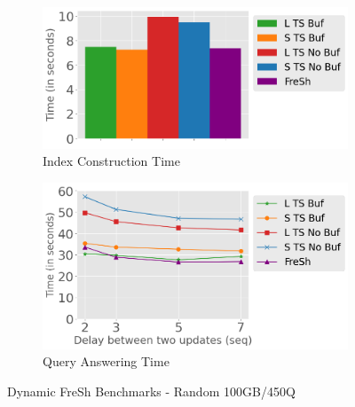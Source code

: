 
\begin{figure}
	\centering
	\begin{subfigure}[c]{0.48\textwidth}
		\includegraphics[width=1\textwidth]   {figures/Experiments/Dynamic/Delays/index_construction_all.png}
		\caption{Index Construction Time}
		\label{fig:actual-index-Construction-time}
	\end{subfigure}
	\begin{subfigure}[c]{0.48\textwidth}
		\includegraphics[width=1\textwidth]   {figures/Experiments/Dynamic/Delays/qa_delay_x_axis.png}
		\caption{Query Answering Time}
		\label{fig:actual-query-answering-time}
	\end{subfigure}
	\caption{Dynamic FreSh Benchmarks - Random 100GB/450Q}
	\label{fig:dfresh-fresh-random}
\end{figure}


